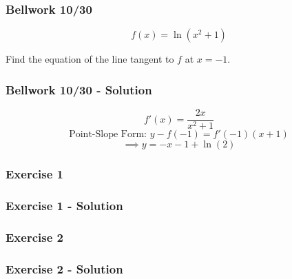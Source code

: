 \documentclass[12pt]{beamer}
\begin{document}
\begin{frame}
	\frametitle{Bellwork 10/30}
	\initclock

	\vfill
	\vfill
	\vfill
	\vfill
	\Large
	\[f(x)=\ln\left(x^{2}+1\right)\]
	\vfill
	\large
	\begin{center}
		Find the equation of the line tangent to $f$ at $x=-1$.
	\end{center}
	\vfill
	\vfill
	\vfill
	\vfill
	\vfill
	\vfill
	\vfill

	\small
	\crono
\end{frame}
\begin{frame}
	\frametitle{Bellwork 10/30 - Solution}

	\vfill
	\vfill
	\vfill
	\Large
	\[f'(x)=\frac{2x}{x^2+1}\]
	\vfill
	\large
	\[\text{Point-Slope Form: }y-f(-1)=f'(-1)(x+1)\]
	\[\implies \boxed{y=-x-1+\ln(2)}\]
	\vfill
	\vfill
	\vfill
\end{frame}
\begin{frame}
	\frametitle{Exercise 1}


\end{frame}
\begin{frame}
	\frametitle{Exercise 1 - Solution}


\end{frame}
\begin{frame}
	\frametitle{Exercise 2}


\end{frame}
\begin{frame}
	\frametitle{Exercise 2 - Solution}


\end{frame}
\end{document}
